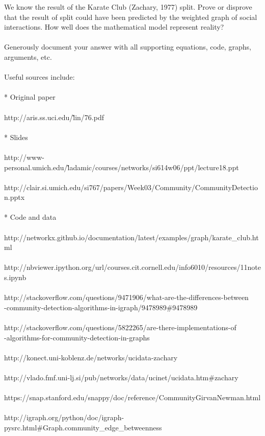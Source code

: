 We know the result of the Karate Club (Zachary, 1977) split.
Prove or disprove that the result of split could have been predicted
by the weighted graph of social interactions.  How well does the
mathematical model represent reality?\\
\\
Generously document your answer with all supporting equations, code,
graphs, arguments, etc.\\
\\
Useful sources include:\\
\\
* Original paper\\
\\
http://aris.ss.uci.edu/\~lin/76.pdf\\
\\
* Slides\\
\\
http://www-personal.umich.edu/\~ladamic/courses/networks/si614w06/ppt/lecture18.ppt\\
\\
http://clair.si.umich.edu/si767/papers/Week03/Community/CommunityDetection.pptx\\
\\
* Code and data\\
\\
http://networkx.github.io/documentation/latest/examples/graph/karate\_club.html\\
\\
http://nbviewer.ipython.org/url/courses.cit.cornell.edu/info6010/resources/11notes.ipynb\\
\\
http://stackoverflow.com/questions/9471906/what-are-the-differences-between\\-community-detection-algorithms-in-igraph/9478989\#9478989\\
\\
http://stackoverflow.com/questions/5822265/are-there-implementations-of\\-algorithms-for-community-detection-in-graphs\\
\\
http://konect.uni-koblenz.de/networks/ucidata-zachary\\
\\
http://vlado.fmf.uni-lj.si/pub/networks/data/ucinet/ucidata.htm\#zachary\\
\\
https://snap.stanford.edu/snappy/doc/reference/CommunityGirvanNewman.html\\
\\
http://igraph.org/python/doc/igraph-pysrc.html\#Graph.community\_edge\_betweenness\\